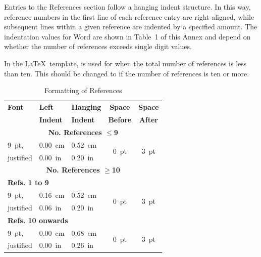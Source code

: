 \documentclass[a4paper,
              ]{jacow}
\begin{document}
Entries to the References section follow a hanging indent
structure. In this way, reference numbers in the first
line of each reference entry are right aligned, while subsequent
lines within a given reference are indented by a
specified amount. The indentation values for Word are
shown in Table~1 of this Annex and depend on whether
the number of references exceeds single digit values.

In the \LaTeX\ template, \verb|| is used for
when the total number of references is less than ten. This
should be changed to \verb|| if the number of
references is ten or more.

\begin{table}[h!t]
	\centering
	\caption{Formatting of References}
	\label{format-refs}
	\begin{tabular}{lllcc}
		\toprule
		\textbf{Font} & \textbf{Left}   & \textbf{Hanging}  & \textbf{Space}   & \textbf{Space} \\
		              & \textbf{Indent} & \textbf{Indent}   & \textbf{Before}  & \textbf{After} \\
		\midrule
		\multicolumn{5}{c}{\textbf{No. References $\le$9}}  \\
		\SI{9}{pt},   & \SI{0.00}{cm}   & \SI{0.52}{cm}     & \multirow{2}{*}{\SI{0}{pt}} 
																			   & \multirow{2}{*}{\SI{3}{pt}}  \\
		justified     & \SI{0.00}{in}   & \SI{0.20}{in}     &                  &             \\
		\midrule
		\multicolumn{5}{c}{\textbf{No. References $\ge$10}}  \\[1mm]
		\multicolumn{5}{l}{\textbf{Refs. 1 to 9}}           \\[1mm]
		\SI{9}{pt},   & \SI{0.16}{cm}   & \SI{0.52}{cm}     &  \multirow{2}{*}{\SI{0}{pt}} 
																			   & \multirow{2}{*}{\SI{3}{pt}}  \\
		justified     & \SI{0.06}{in}   & \SI{0.20}{in}     &                  &             \\[3mm]		\multicolumn{5}{l}{\textbf{Refs. 10 onwards}}    \\[1mm]
		\SI{9}{pt},   & \SI{0.00}{cm}   & \SI{0.68}{cm}     &  \multirow{2}{*}{\SI{0}{pt}} 
																	           & \multirow{2}{*}{\SI{3}{pt}}  \\
		justified     & \SI{0.00}{in}   & \SI{0.26}{in}     &                  &             \\
		\bottomrule  
	\end{tabular}
\end{table}
\end{document}
